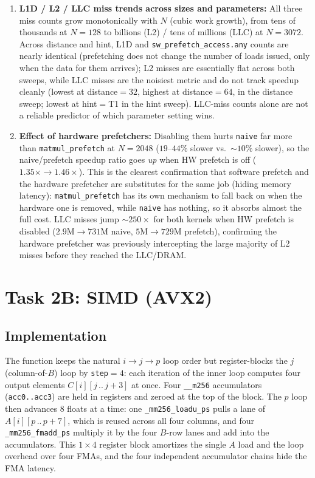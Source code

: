 \documentclass[11pt]{article}
\begin{document}
\begin{enumerate}[leftmargin=1.6em, itemsep=0.4em]
    \item \textbf{L1D / L2 / LLC miss trends across sizes and parameters:}
    All three miss counts grow monotonically with $N$ (cubic work growth),
    from tens of thousands at $N=128$ to billions (L2) / tens of millions
    (LLC) at $N=3072$. Across distance and hint, L1D and \texttt{sw\_prefetch\_access.any}
    counts are nearly identical (prefetching does not change the number of
    loads issued, only when the data for them arrives); L2 misses are
    essentially flat across both sweeps, while LLC misses are the noisiest metric and do not track
    speedup cleanly (lowest at distance$=32$, highest at distance$=64$, in the
    distance sweep; lowest at hint$=$T1 in the hint sweep). LLC-miss counts
    alone are not a reliable predictor of which parameter setting wins.

    \item \textbf{Effect of hardware prefetchers:} Disabling them hurts
    \texttt{naive} far more than \texttt{matmul\_prefetch} at $N=2048$
    ($19$--$44\%$ slower vs.\ $\sim\!10\%$ slower), so the naive/prefetch
    speedup ratio goes \emph{up} when HW prefetch is off ($1.35\times \to
    1.46\times$). This is the clearest confirmation that software prefetch
    and the hardware prefetcher are substitutes for the same job (hiding
    memory latency): \texttt{matmul\_prefetch} has its own mechanism to fall
    back on when the hardware one is removed, while \texttt{naive} has
    nothing, so it absorbs almost the full cost. LLC misses jump
    $\sim\!250\times$ for both kernels when HW prefetch is disabled
    ($2.9$M$\to$$731$M naive, $5$M$\to$$729$M prefetch), confirming the
    hardware prefetcher was previously intercepting the large majority of L2
    misses before they reached the LLC/DRAM.
\end{enumerate}

\section{Task 2B: SIMD (AVX2)}

\subsection{Implementation}

The function keeps the natural $i\to j\to p$ loop order but register-blocks the
$j$ (column-of-$B$) loop by \texttt{step}${}=4$: each iteration of the inner
loop computes four output elements $C[i][j\,..\,j{+}3]$ at once. Four
\texttt{\_\_m256} accumulators (\texttt{acc0..acc3}) are held in registers and
zeroed at the top of the block. The $p$ loop then advances 8 floats at a time:
one \texttt{\_mm256\_loadu\_ps} pulls a lane of $A[i][p\,..\,p{+}7]$, which is
reused across all four columns, and four \texttt{\_mm256\_fmadd\_ps} multiply it
by the four $B$-row lanes and add into the accumulators. This $1\times4$
register block amortizes the single $A$ load and the loop overhead over four
FMAs, and the four independent accumulator chains hide the FMA latency.
\end{document}
